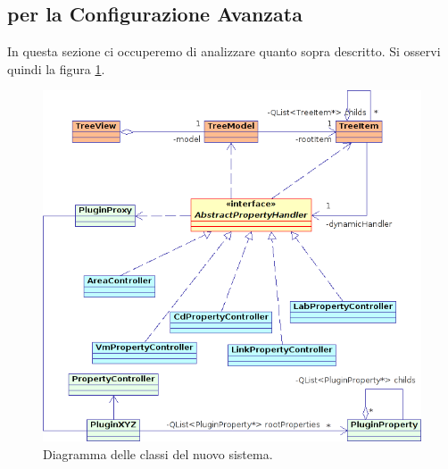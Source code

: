\subsection{\plugin{} per la Configurazione Avanzata}
In questa sezione ci occuperemo di analizzare quanto sopra descritto. Si osservi quindi la figura \ref{figura:properties_uml1}.

\begin{figure}[!htb]
	\centering
	\includegraphics[width=12cm]{images/properties_uml1.png}
	\caption{Diagramma delle classi del nuovo sistema.}
	\label{figura:properties_uml1}
\end{figure}

